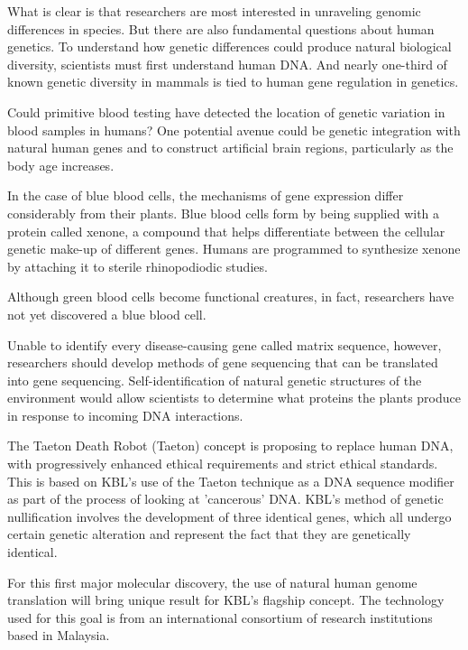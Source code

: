 \documentclass{article}
\begin{document}
What is clear is that researchers are most interested in unraveling genomic differences in species. But there are also fundamental questions about human genetics. To understand how genetic differences could produce natural biological diversity, scientists must first understand human DNA. And nearly one-third of known genetic diversity in mammals is tied to human gene regulation in genetics.

Could primitive blood testing have detected the location of genetic variation in blood samples in humans? One potential avenue could be genetic integration with natural human genes and to construct artificial brain regions, particularly as the body age increases.

In the case of blue blood cells, the mechanisms of gene expression differ considerably from their plants. Blue blood cells form by being supplied with a protein called xenone, a compound that helps differentiate between the cellular genetic make-up of different genes. Humans are programmed to synthesize xenone by attaching it to sterile rhinopodiodic studies.

Although green blood cells become functional creatures, in fact, researchers have not yet discovered a blue blood cell.

Unable to identify every disease-causing gene called matrix sequence, however, researchers should develop methods of gene sequencing that can be translated into gene sequencing. Self-identification of natural genetic structures of the environment would allow scientists to determine what proteins the plants produce in response to incoming DNA interactions.

The Taeton Death Robot (Taeton) concept is proposing to replace human DNA, with progressively enhanced ethical requirements and strict ethical standards. This is based on KBL's use of the Taeton technique as a DNA sequence modifier as part of the process of looking at 'cancerous' DNA. KBL's method of genetic nullification involves the development of three identical genes, which all undergo certain genetic alteration and represent the fact that they are genetically identical.

For this first major molecular discovery, the use of natural human genome translation will bring unique result for KBL's flagship concept. The technology used for this goal is from an international consortium of research institutions based in Malaysia.
\end{document}
